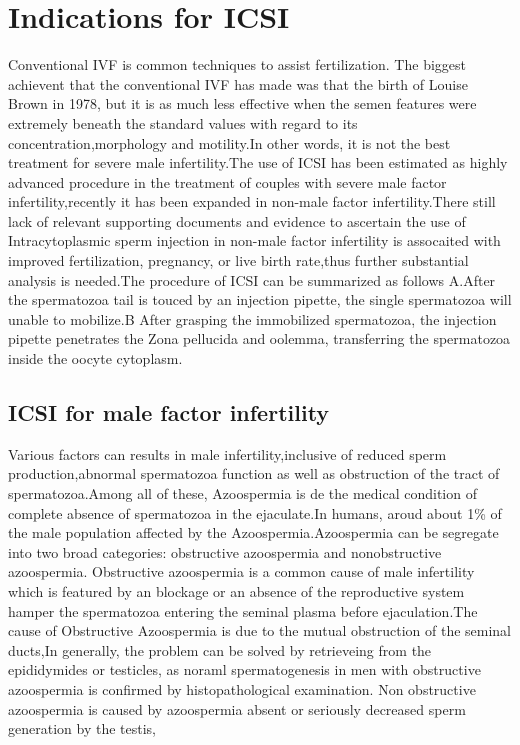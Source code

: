 \documentclass[12pt]{article}
\begin{document}
\section{Indications for ICSI}
Conventional IVF is common techniques to assist fertilization. The biggest achievent that the conventional IVF has made was that the birth of Louise Brown in 1978, but it is as much  less effective when the semen features were extremely beneath the standard values with regard to its concentration,morphology and motility.In other words, it is not the best treatment for severe male infertility.The use of ICSI has been estimated as highly advanced procedure in the treatment  of couples with severe male factor infertility,recently it has been expanded in non-male factor infertility.There still lack of relevant supporting documents and evidence to ascertain the use of 
Intracytoplasmic sperm injection in non-male factor infertility is assocaited with improved fertilization, pregnancy, or live birth rate,thus further substantial analysis is needed.The procedure of ICSI can be summarized as follows A.After the  spermatozoa tail is touced by an injection pipette, the single spermatozoa will unable to mobilize.B
After grasping the immobilized spermatozoa, the injection pipette penetrates the Zona pellucida and oolemma, transferring the spermatozoa inside the oocyte cytoplasm.


\subsection{ICSI for male factor infertility}
Various factors can results in male infertility,inclusive of reduced sperm production,abnormal spermatozoa function as well as  obstruction of the tract of spermatozoa.Among all of these, Azoospermia is de the medical condition of complete absence of spermatozoa in the ejaculate.In humans, aroud about 1\% of the male population affected by the Azoospermia.Azoospermia can be segregate into two broad categories: obstructive azoospermia and nonobstructive azoospermia. Obstructive azoospermia is a common cause of male infertility which is featured by an blockage or an absence of the reproductive system hamper the spermatozoa entering the seminal plasma before ejaculation.The cause of Obstructive Azoospermia is due to the mutual obstruction of the seminal ducts,In generally, the problem can be solved by retrieveing from the epididymides or testicles, as noraml spermatogenesis in men with obstructive azoospermia is confirmed by histopathological examination. Non obstructive
azoospermia is caused by azoospermia absent or seriously decreased sperm generation by the testis,
\end{document}
